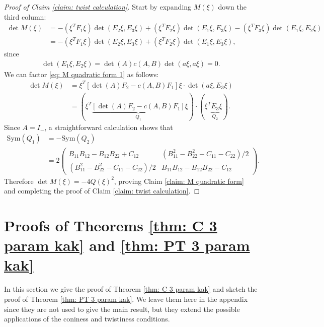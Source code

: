 \documentclass[12pt]{amsart}
\numberwithin{equation}{section}
\newcommand{\1}{\mathbbm{1}}
\newcommand{\sym}{\mathrm{Sym}}
\begin{document}
\begin{proof}[Proof of Claim \ref{claim: twist calculation}]
    Start by expanding $M(\xi)$ down the third column: 
    \begin{align}
        \det M(\xi) &= -(\xi^T F_1 \xi) \det(E_2 \xi, E_3 \xi) + (\xi^T F_2 \xi) \det(E_1 \xi, E_3 \xi) - (\xi^T F_3 \xi) \det(E_1 \xi, E_2 \xi) \\
        &= -(\xi^T F_1 \xi) \det(E_2 \xi, E_3 \xi) + (\xi^T F_2 \xi) \det(E_1 \xi, E_3 \xi), \label{eq: M quadratic form 1}
    \end{align}
    since 
    \begin{align}
        \det(E_1 \xi, E_2 \xi) = \det(A) c(A,B) \det(a\xi,a\xi) = 0.
    \end{align}
    We can factor \eqref{eq: M quadratic form 1} as follows: 
    \begin{align}
        \det M(\xi) &= \xi^T [\det(A) F_2 - c(A,B) F_1] \xi \cdot \det(a\xi, E_3 \xi) \\
        &= (\xi^T \underbrace{[\det(A) F_2 - c(A,B) F_1]}_{Q_1}\xi) \cdot (\xi^T \underbrace{E_3}_{Q_2} \xi). 
    \end{align}
    Since $A=I_-$, a straightforward calculation shows that
    \begin{align}
        \sym(Q_1) &= -\sym(Q_2) \\ &= 2
        \begin{pmatrix}
                B_{11} B_{12}-B_{12} B_{22}  + C_{12} & (B_{11}^2 - B_{22}^2 - C_{11} - C_{22})/2 \\
                (B_{11}^2 - B_{22}^2 - C_{11} - C_{22})/2 & 
                B_{11} B_{12} - B_{12} B_{22} - C_{12}
            \end{pmatrix}.
    \end{align}
    Therefore $\det M(\xi) = - 4Q(\xi)^2$, proving Claim \ref{claim: M quadratic form} and completing the proof of Claim \ref{claim: twist calculation}.
\end{proof}


\appendix

\section{Proofs of Theorems \ref{thm: C 3 param kak} and \ref{thm: PT 3 param kak}}\label{appendix: A}

In this section we give the proof of Theorem \ref{thm: C 3 param kak} and sketch the proof of Theorem \ref{thm: PT 3 param kak}. We leave them here in the appendix since they are not used to give the main result, but they extend the possible applications of the coniness and twistiness conditions.
\end{document}
